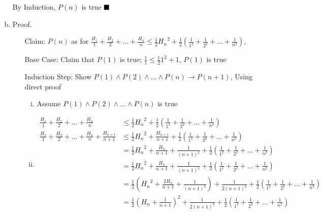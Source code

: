\documentclass{article}
\def\math#1{$#1$}
\begin{document}
\begin{enumerate}[(a)]
\begin{itemize}
\begin{enumerate}[i)]
                \end{enumerate} 
        \end{itemize}
        By Induction, \math{P(n)} is true  \math{\hfill{\blacksquare}}
            \item Proof. \ 
                \begin{itemize}
                \item [Claim: ] \math{P(n)} as for \math{\frac{H_1}{1} + \frac{H_2}{2} + ... + \frac{H_n}{n} \leq \frac{1}{2}{H_n}^2 + \frac{1}{2}(\frac{1}{1^2}+\frac{1}{2^2}+...+\frac{1}{n^2})}, 
                \item [Base Case: ] Claim that \math{P(1)} is true; \math{\frac{1}{1} \leq \frac{1}{2}1^2+1}, \math{P(1)} is true
                \item [Induction Step: ] Show \math{P(1)\land P(2)\land ... \land P(n) \to P(n+1)}, Using direct proof 
                    \begin{enumerate}[i)]
                        \item Assume \math{P(1)\land P(2)\land ... \land P(n)} is true
                        \item \begin{equation}
                                \begin{split}
                                            \frac{H_1}{1} + \frac{H_2}{2} + ... + \frac{H_n}{n} & \leq \frac{1}{2}{H_n}^2 + \frac{1}{2}(\frac{1}{1^2}+\frac{1}{2^2}+...+\frac{1}{n^2}) \\
                                            \frac{H_1}{1} + \frac{H_2}{2} + ... + \frac{H_n}{n} + \frac{H_{n+1}}{n+1} & \leq \frac{1}{2}{H_n}^2 + \frac{H_{n+1}}{n+1} + \frac{1}{2}(\frac{1}{1^2}+\frac{1}{2^2}+...+\frac{1}{n^2}) \\
                                            & = \frac{1}{2}{H_n}^2 + \frac{H_n}{n+1} + \frac{1}{{(n+1)}^2} + \frac{1}{2}(\frac{1}{1^2}+\frac{1}{2^2}+...+\frac{1}{n^2})\\
                                            & = \frac{1}{2}{H_n}^2 + \frac{H_n}{n+1} + \frac{1}{{(n+1)}^2} + \frac{1}{2}(\frac{1}{1^2}+\frac{1}{2^2}+...+\frac{1}{n^2})\\
                                            & = \frac{1}{2}({H_n}^2 + \frac{2H_n}{n+1} + \frac{1}{{(n+1)}^2}) + \frac{1}{2{(n+1)}^2} + \frac{1}{2}(\frac{1}{1^2}+\frac{1}{2^2}+...+\frac{1}{n^2}) \\ 
                                            & = \frac{1}{2}{(H_n + \frac{1}{n+1})}^2 + \frac{1}{2{(n+1)}^2} + \frac{1}{2}(\frac{1}{1^2}+\frac{1}{2^2}+...+\frac{1}{n^2}) \\ 

\end{split}
\end{equation}
\end{enumerate}
\end{itemize}
\end{enumerate}
\end{document}
